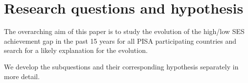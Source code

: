



\section{Research questions and hypothesis}

The overarching aim of this paper is to study the evolution of the high/low SES achievement gap in the past 15 years for all PISA participating countries and search for a likely explanation for the evolution.

\noindent
We develop the subquestions and their corresponding hypothesis separately in more detail.

